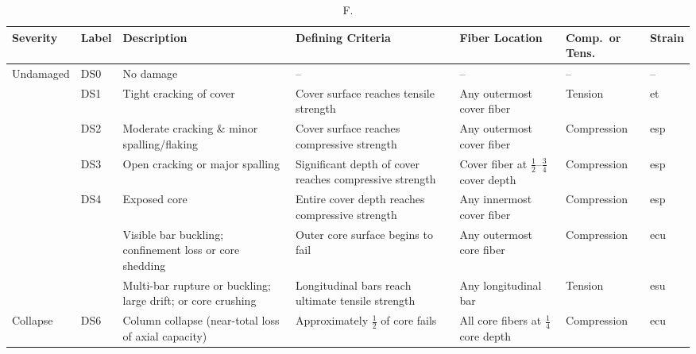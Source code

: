\begin{table}[H]
\centering
\caption{F.}
\label{tab:DS-F}
\begin{adjustbox}{width=1\textwidth}
\renewcommand{\arraystretch}{1.4}
\begin{tabular}{>{\centering\arraybackslash}m{1.8cm}
                 >{\centering\arraybackslash}m{1.0cm}
                 m{3.8cm}
                 m{4.8cm}
                 m{3.2cm}
                 >{\centering\arraybackslash}m{2.2cm}
                 >{\centering\arraybackslash}m{1.2cm}}
\toprule
\textbf{Severity} & \textbf{Label} & \textbf{Description} & \textbf{Defining Criteria} &
\textbf{Fiber Location} & \textbf{Comp.\ or Tens.} & \textbf{Strain} \\
\midrule

Undamaged       & DS0 & No damage & -- & -- & -- & -- \\
\cmidrule{2-7}
\multirow{3}{*}{Cosmetic}
                & DS1 & Tight cracking of cover &
  Cover surface reaches tensile strength &
  Any outermost cover fiber & Tension & \gls{et} \\
                & DS2 & Moderate cracking \& minor spalling/flaking &
  Cover surface reaches compressive strength &
  Any outermost cover fiber & Compression & \gls{esp} \\
                & DS3 & Open cracking or major spalling &
  Significant depth of cover reaches compressive strength &
  Cover fiber at $\tfrac{1}{2}$--$\tfrac{3}{4}$ cover depth & Compression & \gls{esp} \\
\cmidrule{2-7}
\multirow{3}{*}{Structural}
                & DS4 & Exposed core &
  Entire cover depth reaches compressive strength &
  Any innermost cover fiber & Compression & \gls{esp} \\
                & \multirow{2}{*}{DS5} &
  Visible bar buckling; confinement loss or core shedding &
  Outer core surface begins to fail &
  Any outermost core fiber & Compression & \gls{ecu} \\
                & & Multi-bar rupture or buckling; large drift; or core crushing &
  Longitudinal bars reach ultimate tensile strength &
  Any longitudinal bar & Tension & \gls{esu} \\
\cmidrule{2-7}
Collapse        & DS6 & Column collapse (near-total loss of axial capacity) &
  Approximately $\tfrac{1}{2}$ of core fails &
  All core fibers at $\tfrac{1}{4}$ core depth & Compression & \gls{ecu} \\
\bottomrule
\end{tabular}
\end{adjustbox}
\end{table}

